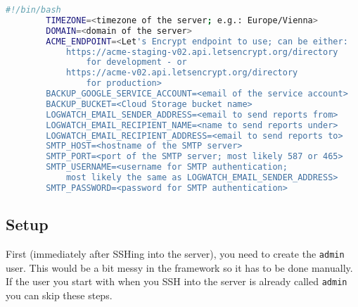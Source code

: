 \documentclass[12pt,a4paper]{report}
\begin{document}
	\pagebreak
	\begin{lstlisting}[language=bash]
		#!/bin/bash
		TIMEZONE=<timezone of the server; e.g.: Europe/Vienna>
		DOMAIN=<domain of the server>
		ACME_ENDPOINT=<Let's Encrypt endpoint to use; can be either:
		    https://acme-staging-v02.api.letsencrypt.org/directory
		        for development - or
		    https://acme-v02.api.letsencrypt.org/directory
		        for production>
		BACKUP_GOOGLE_SERVICE_ACCOUNT=<email of the service account>
		BACKUP_BUCKET=<Cloud Storage bucket name>
		LOGWATCH_EMAIL_SENDER_ADDRESS=<email to send reports from>
		LOGWATCH_EMAIL_RECIPIENT_NAME=<name to send reports under>
		LOGWATCH_EMAIL_RECIPIENT_ADDRESS=<email to send reports to>
		SMTP_HOST=<hostname of the SMTP server>
		SMTP_PORT=<port of the SMTP server; most likely 587 or 465>
		SMTP_USERNAME=<username for SMTP authentication;
		    most likely the same as LOGWATCH_EMAIL_SENDER_ADDRESS>
		SMTP_PASSWORD=<password for SMTP authentication>
	\end{lstlisting}

	\subsection{Setup}
	First (immediately after SSHing into the server), you need to create the \lstinline|admin| user. This would be a bit messy in the framework so it has to be done manually. If the user you start with when you SSH into the server is already called \lstinline|admin| you can skip these steps.
\end{document}
